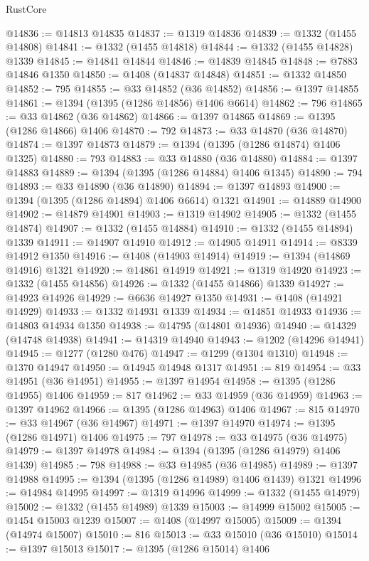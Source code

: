 \begin{lexlean}{RustCore}
\begin{coremodule}
@14836 := @14813 @14835
@14837 := @1319 @14836
@14839 := @1332 (@1455 @14808)
@14841 := @1332 (@1455 @14818)
@14844 := @1332 (@1455 @14828) @1339
@14845 := @14841 @14844
@14846 := @14839 @14845
@14848 := @7883 @14846 @1350
@14850 := @1408 (@14837 @14848)
@14851 := @1332 @14850
@14852 := 795
@14855 := @33 @14852 (@36 @14852)
@14856 := @1397 @14855
@14861 := @1394 (@1395 (@1286 @14856) @1406 @6614)
@14862 := 796
@14865 := @33 @14862 (@36 @14862)
@14866 := @1397 @14865
@14869 := @1395 (@1286 @14866) @1406
@14870 := 792
@14873 := @33 @14870 (@36 @14870)
@14874 := @1397 @14873
@14879 := @1394 (@1395 (@1286 @14874) @1406 @1325)
@14880 := 793
@14883 := @33 @14880 (@36 @14880)
@14884 := @1397 @14883
@14889 := @1394 (@1395 (@1286 @14884) @1406 @1345)
@14890 := 794
@14893 := @33 @14890 (@36 @14890)
@14894 := @1397 @14893
@14900 := @1394 (@1395 (@1286 @14894) @1406 @6614) @1321
@14901 := @14889 @14900
@14902 := @14879 @14901
@14903 := @1319 @14902
@14905 := @1332 (@1455 @14874)
@14907 := @1332 (@1455 @14884)
@14910 := @1332 (@1455 @14894) @1339
@14911 := @14907 @14910
@14912 := @14905 @14911
@14914 := @8339 @14912 @1350
@14916 := @1408 (@14903 @14914)
@14919 := @1394 (@14869 @14916) @1321
@14920 := @14861 @14919
@14921 := @1319 @14920
@14923 := @1332 (@1455 @14856)
@14926 := @1332 (@1455 @14866) @1339
@14927 := @14923 @14926
@14929 := @6636 @14927 @1350
@14931 := @1408 (@14921 @14929)
@14933 := @1332 @14931 @1339
@14934 := @14851 @14933
@14936 := @14803 @14934 @1350
@14938 := @14795 (@14801 @14936)
@14940 := @14329 (@14748 @14938)
@14941 := @14319 @14940
@14943 := @1202 (@14296 @14941)
@14945 := @1277 (@1280 @476)
@14947 := @1299 (@1304 @1310)
@14948 := @1370 @14947
@14950 := @14945 @14948 @1317
@14951 := 819
@14954 := @33 @14951 (@36 @14951)
@14955 := @1397 @14954
@14958 := @1395 (@1286 @14955) @1406
@14959 := 817
@14962 := @33 @14959 (@36 @14959)
@14963 := @1397 @14962
@14966 := @1395 (@1286 @14963) @1406
@14967 := 815
@14970 := @33 @14967 (@36 @14967)
@14971 := @1397 @14970
@14974 := @1395 (@1286 @14971) @1406
@14975 := 797
@14978 := @33 @14975 (@36 @14975)
@14979 := @1397 @14978
@14984 := @1394 (@1395 (@1286 @14979) @1406 @1439)
@14985 := 798
@14988 := @33 @14985 (@36 @14985)
@14989 := @1397 @14988
@14995 := @1394 (@1395 (@1286 @14989) @1406 @1439) @1321
@14996 := @14984 @14995
@14997 := @1319 @14996
@14999 := @1332 (@1455 @14979)
@15002 := @1332 (@1455 @14989) @1339
@15003 := @14999 @15002
@15005 := @1454 @15003 @1239
@15007 := @1408 (@14997 @15005)
@15009 := @1394 (@14974 @15007)
@15010 := 816
@15013 := @33 @15010 (@36 @15010)
@15014 := @1397 @15013
@15017 := @1395 (@1286 @15014) @1406

\end{coremodule}
\end{lexlean}
